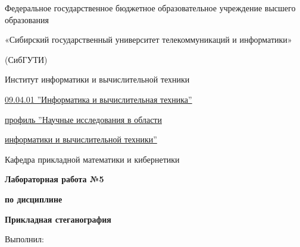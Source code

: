 \documentclass[12pt, a4paper, english, russian]{article}
\begin{document}
\begin{titlepage}
	\begin{center}
		{\fontsize{11}{13}
			Федеральное государственное бюджетное образовательное учреждение высшего образования

			«Сибирский государственный университет телекоммуникаций и информатики»

			(СибГУТИ)
		}
	\end{center}
	\begin{center}
		\begin{large}
			Институт информатики и вычислительной техники
		\end{large}
	\end{center}

	\begin{flushright}
		\begin{minipage}[t]{0.59\textwidth}

			\uline{09.04.01 ''Информатика и вычислительная техника''}

			\uline{профиль ''Научные исследования в области}

			\uline{информатики и вычислительной техники''}

		\end{minipage}
	\end{flushright}

	\vspace{0.012\textheight}

	\begin{center}
		\begin{large}
			Кафедра прикладной математики и кибернетики
		\end{large}
	\end{center}

	\vspace{0.1\textheight}

	\begin{center}
		\begin{Large}
			\textbf{Лабораторная работа №5}

			\textbf{по дисциплине}

			\textbf{Прикладная стеганография}

		\end{Large}
	\end{center}

	\vspace{0.12\textheight}

	\begin{flushleft}
		\begin{large}
			Выполнил:
			\vspace{0.012\textheight}


\end{large}
\end{flushleft}
\end{titlepage}
\end{document}
